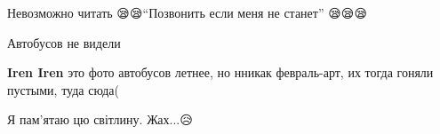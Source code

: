 
Невозможно читать 😪😪\enquote{Позвонить если меня не станет} 😪😪😪


Автобусов не видели

\begin{itemize} %
\textbf{Iren Iren} это фото автобусов летнее, но нникак февраль-арт, их тогда гоняли пустыми, туда сюда(
\end{itemize} %


Я пам'ятаю цю світлину. Жах...😥

